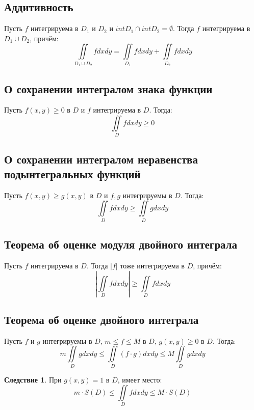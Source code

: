 \documentclass[a4paper, 14pt]{report}
\theoremstyle{definition}
\newtheorem*{implication}{Следствие}
\begin{document}
		\subsection{Аддитивность}
			Пусть $f$ интегрируема в $D_1$ и $D_2$ и $intD_1\cap intD_2=\emptyset$. Тогда $f$ интегрируема в $D_1\cup D_2$, причём:
			\begin{equation}
				\iint\limits_{D_1\cup D_2}fdxdy=\iint\limits_{D_1}fdxdy+\iint\limits_{D_2}fdxdy
			\end{equation}
		\subsection{О сохранении интегралом знака функции}
			Пусть $f(x,y)\ge0$ в $D$ и $f$ интегрируема в $D$. Тогда:
			\begin{equation}
				\iint\limits_{D}fdxdy\ge0
			\end{equation}
		\subsection{О сохранении интегралом неравенства подынтегральных функций}
			Пусть $f(x, y)\ge g(x, y)$ в $D$ и $f, g$ интегрируемы в $D$. Тогда:
			\begin{equation}
				\iint\limits_{D}fdxdy\ge \iint\limits_{D}gdxdy
			\end{equation}
		\subsection{Теорема об оценке модуля двойного интеграла}
			Пусть $f$ интегрируема в $D$. Тогда $|f|$ тоже интегрируема в $D$, причём:
			\begin{equation}
				\left|\iint\limits_{D}fdxdy\right|\ge\iint\limits_{D}fdxdy
			\end{equation}
		\subsection{Теорема об оценке двойного интеграла}
			Пусть $f$ и $g$ интегрируемы в $D$, $m\le f\le M$ в $D$, $g(x,y)\ge0$ в $D$. Тогда:
			\begin{equation}
				m\iint\limits_{D}gdxdy\le\iint\limits_{D}(f\cdot g)dxdy\le M\iint\limits_{D}gdxdy
			\end{equation}

			\begin{implication}
				При $g(x,y)=1$ в $D$, имеет место:
				\begin{equation}
					m\cdot S(D)\le\iint\limits_{D}fdxdy\le M\cdot S(D)
				\end{equation}
			\end{implication}
\end{document}
